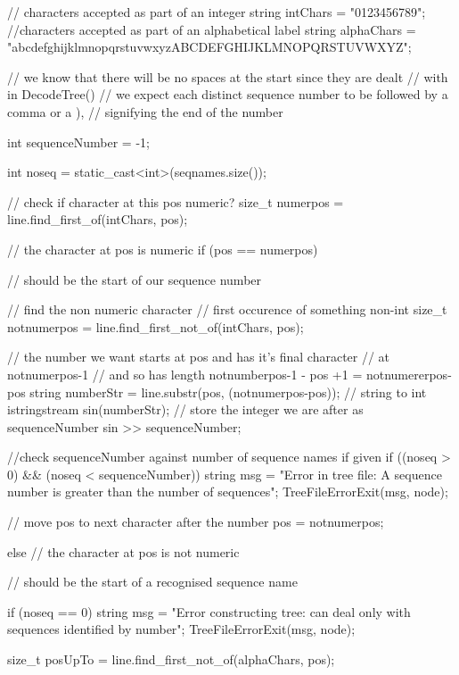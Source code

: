 \begin{DoxyCode}
{

                    // characters accepted as part of an integer
  string intChars = "0123456789";
                    //characters accepted as part of an alphabetical label
  string alphaChars = "abcdefghijklmnopqrstuvwxyzABCDEFGHIJKLMNOPQRSTUVWXYZ";

  // we know that there will be no spaces at the start since they are dealt 
  // with in DecodeTree()
  // we expect each distinct sequence number to be followed by a comma or a ), 
  // signifying the end of the number

  int sequenceNumber = -1;

  int noseq = static_cast<int>(seqnames.size());

  // check if character at this pos numeric?
  size_t numerpos = line.find_first_of(intChars, pos);

                    // the character at pos is numeric
  if (pos == numerpos)
  {
    // should be the start of our sequence number

    // find the non numeric character
                    // first occurence of something non-int
    size_t notnumerpos = line.find_first_not_of(intChars, pos);

    // the number we want starts at pos and has it's final character 
    // at notnumerpos-1
    // and so has length notnumberpos-1 - pos +1 = notnumererpos-pos
    string numberStr = line.substr(pos, (notnumerpos-pos));
    // string to int
    istringstream sin(numberStr);
                    // store the integer we are after as sequenceNumber
    sin >> sequenceNumber;

    //check sequenceNumber against number of sequence names if given
    if ((noseq > 0) && (noseq < sequenceNumber))
    {
      string msg = 
      "Error in tree file: A sequence number is \n greater than the number of
       sequences";
      TreeFileErrorExit(msg, node);
    }

                    // move pos to next character after the number
    pos = notnumerpos;
  }

  else              // the character at pos is not numeric
  {
    // should be the start of a recognised sequence name

    if (noseq == 0)
    {
      string msg = 
      "Error constructing tree: can deal only with sequences identified by
       number";
      TreeFileErrorExit(msg, node);
    }

    size_t posUpTo = line.find_first_not_of(alphaChars, pos);

}}
\end{DoxyCode}

